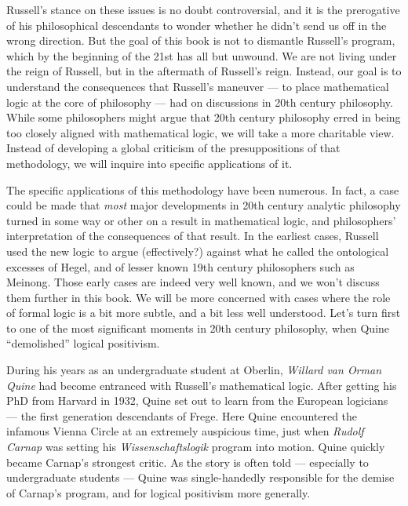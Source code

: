Russell's stance on these issues is no doubt controversial, and it is
the prerogative of his philosophical descendants to wonder whether he
didn't send us off in the wrong direction.  But the goal of this book
is not to dismantle Russell's program, which by the beginning of the
21st has all but unwound.  We are not living under the reign of
Russell, but in the aftermath of Russell's reign.  Instead, our goal
is to understand the consequences that Russell's maneuver --- to place
mathematical logic at the core of philosophy --- had on discussions in
20th century philosophy.  While some philosophers might argue that
20th century philosophy erred in being too closely aligned with
mathematical logic, we will take a more charitable view.  Instead of
developing a global criticism of the presuppositions of that
methodology, we will inquire into specific applications of it.

The specific applications of this methodology have been numerous.  In
fact, a case could be made that {\it most} major developments in 20th
century analytic philosophy turned in some way or other on a result in
mathematical logic, and philosophers' interpretation of the
consequences of that result.  In the earliest cases, Russell used the
new logic to argue (effectively?) against what he called the
ontological excesses of Hegel, and of lesser known 19th century
philosophers such as Meinong.  Those early cases are indeed very well
known, and we won't discuss them further in this book.  We will be
more concerned with cases where the role of formal logic is a bit more
subtle, and a bit less well understood.  Let's turn first to one of
the most significant moments in 20th century philosophy, when Quine
``demolished'' logical positivism.

During his years as an undergraduate student at Oberlin, \emph{Willard
  van Orman Quine} had become entranced with Russell's mathematical
logic.  After getting his PhD from Harvard in 1932, Quine set out to
learn from the European logicians --- the first generation descendants
of Frege.  Here Quine encountered the infamous Vienna Circle at an
extremely auspicious time, just when \emph{Rudolf Carnap} was setting
his {\it Wissenschaftslogik} program into motion.  Quine quickly
became Carnap's strongest critic.  As the story is often told ---
especially to undergraduate students --- Quine was single-handedly
responsible for the demise of Carnap's program, and for logical
positivism more generally.

